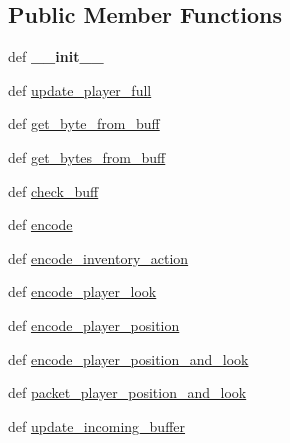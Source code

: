 \subsection*{Public Member Functions}
\begin{DoxyCompactItemize}
\item 
\hypertarget{classMinecraftClientEncoder_1_1MinecraftClientEncoder_a5301388bb9d010444b9e443f02700644}{def {\bfseries \-\_\-\-\_\-init\-\_\-\-\_\-}}\label{classMinecraftClientEncoder_1_1MinecraftClientEncoder_a5301388bb9d010444b9e443f02700644}

\item 
def \hyperlink{classMinecraftClientEncoder_1_1MinecraftClientEncoder_adcb6cbc129dd2550e43550130e2d9df4}{update\-\_\-player\-\_\-full}
\item 
def \hyperlink{classMinecraftClientEncoder_1_1MinecraftClientEncoder_a8fa7df816f3cbd53b3b33d3f8410b69d}{get\-\_\-byte\-\_\-from\-\_\-buff}
\item 
def \hyperlink{classMinecraftClientEncoder_1_1MinecraftClientEncoder_aaec67d40f2f12790ba2eb80056d4dfac}{get\-\_\-bytes\-\_\-from\-\_\-buff}
\item 
def \hyperlink{classMinecraftClientEncoder_1_1MinecraftClientEncoder_ac0479e9e9e50e233b6760760e2f36086}{check\-\_\-buff}
\item 
def \hyperlink{classMinecraftClientEncoder_1_1MinecraftClientEncoder_a4fb9902dfc35420f15158fbe8fe66ef5}{encode}
\item 
def \hyperlink{classMinecraftClientEncoder_1_1MinecraftClientEncoder_a5acf28fd1c6f249076dab2722ce2ef72}{encode\-\_\-inventory\-\_\-action}
\item 
def \hyperlink{classMinecraftClientEncoder_1_1MinecraftClientEncoder_ad3eb52ed31fba33e0d747735f5b2bfc9}{encode\-\_\-player\-\_\-look}
\item 
def \hyperlink{classMinecraftClientEncoder_1_1MinecraftClientEncoder_a3d5bc97e9e3799a8b05ed55f93120566}{encode\-\_\-player\-\_\-position}
\item 
def \hyperlink{classMinecraftClientEncoder_1_1MinecraftClientEncoder_ac53ed9c8f931ef5ed59efeb4d774ed04}{encode\-\_\-player\-\_\-position\-\_\-and\-\_\-look}
\item 
def \hyperlink{classMinecraftClientEncoder_1_1MinecraftClientEncoder_a39798d1a84a2d931c1e8cc13f8a245c3}{packet\-\_\-player\-\_\-position\-\_\-and\-\_\-look}
\item 
def \hyperlink{classMinecraftClientEncoder_1_1MinecraftClientEncoder_a69016c89352da1024f9119da6da2c2eb}{update\-\_\-incoming\-\_\-buffer}

\end{DoxyCompactItemize}
